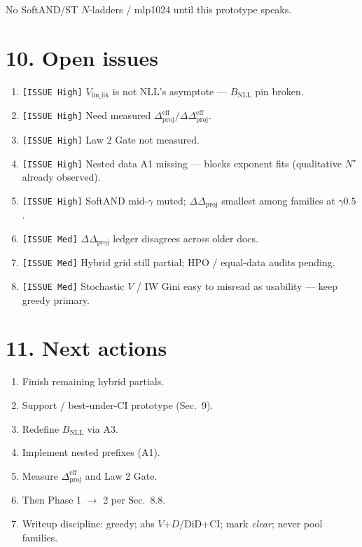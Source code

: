 \documentclass[11pt]{article}
\newcommand{\phonesection}[1]{\Needspace{8\baselineskip}\section*{#1}}
\newcommand{\stag}[1]{\texttt{[#1]}}
\newcommand{\DDproj}{\Delta\Delta_{\mathrm{proj}}}
\newcommand{\Dprojeff}{\Delta_{\mathrm{proj}}^{\mathrm{eff}}}
\newcommand{\DDprojeff}{\Delta\Delta_{\mathrm{proj}}^{\mathrm{eff}}}
\begin{document}
No SoftAND/ST $N$-ladders / mlp1024 until
this prototype speaks.

\phonesection{10. Open issues}

\begin{enumerate}
  \item \stag{ISSUE High} $V_{\mathrm{lin\_lik}}$
        is not NLL's asymptote ---
        $B_{\mathrm{NLL}}$ pin broken.
  \item \stag{ISSUE High} Need measured
        $\Dprojeff/\DDprojeff$.
  \item \stag{ISSUE High} Law 2 Gate not
        measured.
  \item \stag{ISSUE High} Nested data A1
        missing --- blocks exponent fits
        (qualitative $N^{\star}$ already
        observed).
  \item \stag{ISSUE High} SoftAND mid-$\gamma$
        muted; $\DDproj$ smallest among
        families at $\gamma0.5$.
  \item \stag{ISSUE Med} $\DDproj$ ledger
        disagrees across older docs.
  \item \stag{ISSUE Med} Hybrid grid still
        partial; HPO / equal-data audits
        pending.
  \item \stag{ISSUE Med} Stochastic $V$ /
        IW Gini easy to misread as usability
        --- keep greedy primary.
\end{enumerate}

\phonesection{11. Next actions}

\begin{enumerate}
  \item Finish remaining hybrid partials.
  \item Support / best-under-CI prototype
        (Sec.~9).
  \item Redefine $B_{\mathrm{NLL}}$ via A3.
  \item Implement nested prefixes (A1).
  \item Measure $\Dprojeff$ and Law 2 Gate.
  \item Then Phase 1 $\to$ 2 per Sec.~8.8.
  \item Writeup discipline: greedy; abs
        $V$+$D$/DiD+CI; mark \emph{clear};
        never pool families.
\end{enumerate}
\end{document}
